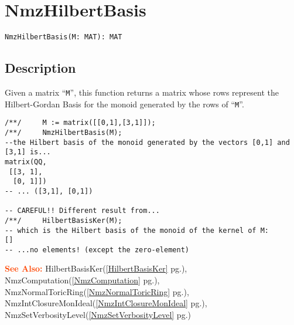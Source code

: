 \documentclass[a4paper]{mybook}
\newenvironment{command}{}{} %
\newcommand\SeeAlso{\par\textcolor{OrangeRed}{\textbf{\large See Also: }}}
\begin{document}
\section{NmzHilbertBasis}
\label{NmzHilbertBasis}
\begin{command} %


\begin{Verbatim}[label=syntax, rulecolor=\color{MidnightBlue},
frame=single]
NmzHilbertBasis(M: MAT): MAT
\end{Verbatim}


\subsection*{Description}

Given a matrix ``\verb&M&'', this function returns a matrix whose rows represent
the Hilbert-Gordan Basis for the monoid generated by the rows of ``\verb&M&''.
\begin{Verbatim}[label=example, rulecolor=\color{PineGreen}, frame=single]
/**/     M := matrix([[0,1],[3,1]]);
/**/     NmzHilbertBasis(M);
--the Hilbert basis of the monoid generated by the vectors [0,1] and [3,1] is...
matrix(QQ,
 [[3, 1],
  [0, 1]])
-- ... ([3,1], [0,1])

-- CAREFUL!! Different result from...
/**/     HilbertBasisKer(M);
-- which is the Hilbert basis of the monoid of the kernel of M:
[]
-- ...no elements! (except the zero-element)
\end{Verbatim}


\SeeAlso %
  HilbertBasisKer(\ref{HilbertBasisKer} pg.\pageref{HilbertBasisKer}), 
    NmzComputation(\ref{NmzComputation} pg.\pageref{NmzComputation}), 
    NmzNormalToricRing(\ref{NmzNormalToricRing} pg.\pageref{NmzNormalToricRing}), 
    NmzIntClosureMonIdeal(\ref{NmzIntClosureMonIdeal} pg.\pageref{NmzIntClosureMonIdeal}), 
    NmzSetVerbosityLevel(\ref{NmzSetVerbosityLevel} pg.\pageref{NmzSetVerbosityLevel})
\end{command} %
\end{document}
